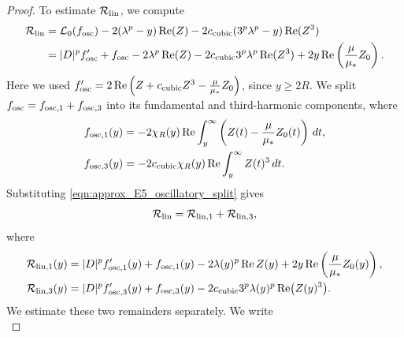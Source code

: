 \documentclass[11pt]{amsart}
\theoremstyle{definition}
\theoremstyle{remark}
\numberwithin{equation}{section}
\newcommand{\mc}[1]{\mathcal{#1}}
\begin{document}
\begin{proof}
    To estimate $\mc{R}_{\textup{lin}}$, we compute 
    \begin{align*}
        \mc{R}_{\textup{lin}} & = \mc{L}_0(f_{\textup{osc}}) - 2(\lambda^p - y)\operatorname{Re}(Z) - 2c_{\textup{cubic}}(3^p\lambda^p - y)\operatorname{Re}(Z^3) \\
        & = |D|^pf_{\textup{osc}}' + f_{\textup{osc}} - 2\lambda^p\operatorname{Re}(Z) - 2c_{\textup{cubic}}3^p\lambda^p\operatorname{Re}(Z^3) + 2y\operatorname{Re}\left(\frac{\mu}{\mu_*}Z_0\right).
    \end{align*}
    Here we used $f_{\textup{osc}}'=2\operatorname{Re}\left(Z+c_{\textup{cubic}}Z^3-\frac{\mu}{\mu_*}Z_0\right)$, since $y\geq2R$.
    We split $f_{\textup{osc}}=f_{\textup{osc},1}+f_{\textup{osc},3}$ into its fundamental and third-harmonic components, where
    \begin{equation}\label{eqn:approx_E5_oscillatory_split}
        \begin{aligned}
            f_{\textup{osc},1}(y)&=-2\chi_R(y)\operatorname{Re}\int_y^\infty\left(Z(t)-\frac{\mu}{\mu_*}Z_0(t)\right)\,dt,\\
            f_{\textup{osc},3}(y)&=-2c_{\textup{cubic}}\chi_R(y)\operatorname{Re}\int_y^\infty Z(t)^3\,dt.
        \end{aligned}
    \end{equation}
    Substituting \eqref{eqn:approx_E5_oscillatory_split} gives
    \begin{equation}\label{eqn:approx_E5_linear_split}
        \mc{R}_{\textup{lin}}=\mc{R}_{\textup{lin},1}+\mc{R}_{\textup{lin},3},
    \end{equation}
    where
    \begin{equation}\label{eqn:approx_E5_linear_components}
        \begin{aligned}
            \mc{R}_{\textup{lin},1}(y)
            &=|D|^pf_{\textup{osc},1}'(y)+f_{\textup{osc},1}(y)
            -2\lambda(y)^p\operatorname{Re}Z(y)
            +2y\operatorname{Re}\left(\frac{\mu}{\mu_*}Z_0(y)\right),\\
            \mc{R}_{\textup{lin},3}(y)
            &=|D|^pf_{\textup{osc},3}'(y)+f_{\textup{osc},3}(y)
            -2c_{\textup{cubic}}3^p\lambda(y)^p\operatorname{Re}\bigl(Z(y)^3\bigr).
        \end{aligned}
    \end{equation}
    We estimate these two remainders separately. We write
    \begin{equation}\label{eqn:approx_E5_fundamental_localization}

\end{equation}
\end{proof}
\end{document}
